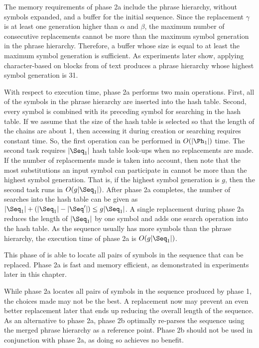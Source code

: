 The memory requirements of phase 2a include the phrase hierarchy,
without symbols expanded, and a buffer for the initial sequence.  
Since the replacement $\gamma$ is at least one generation
higher than $\alpha$ and $\beta$, the maximum number of consecutive
replacements cannot be more than the maximum symbol generation in the
phrase hierarchy.  Therefore, a buffer whose size is
equal to at least the maximum symbol generation is sufficient.
As experiments later show, applying character-based \repair
on blocks from  of text 
produces a phrase hierarchy whose highest
symbol generation is 31.

With respect to execution time, phase 2a performs two main operations.
First, all of the symbols in the phrase hierarchy are inserted into
the hash table.  Second, every symbol is combined with its preceding
symbol for searching in the hash table.  If we assume that
the size of the hash table is selected so that the length of
the chains are about 1, then
accessing it during creation or searching
requires constant time.  So, the first operation can be
performed in $O(|\Ph_1|)$ time.  The second task requires 
$|\Seq_1|$ hash table look-ups when no replacements are
made.  If the number of replacements made is taken into account, 
then note that the most substitutions an input symbol
can participate in cannot be more than the highest symbol 
generation.  That is, if the highest symbol generation is $g$,
then the second task runs in $O(g|\Seq_1|)$.  After phase 2a
completes, the number of searches into the hash table can be given
as $|\Seq_1| + (|\Seq_1| - |\Seq'|) \leq g|\Seq_1|$.
A single replacement during phase 2a reduces 
the length of $|\Seq_1|$ by one symbol and adds one search 
operation into the hash table.  
As the sequence usually has more symbols than the phrase
hierarchy, the execution time of phase 2a is $O(g|\Seq_1|)$.

This phase of \remerge is able to locate all pairs of symbols in
the sequence that can be replaced.  Phase 2a is fast and
memory efficient, as demonstrated in experiments later in this chapter.


While phase 2a locates all pairs of symbols in the sequence
produced by phase 1, the choices made may not be the best.
A replacement now may prevent an even better replacement later
that ends up reducing the overall length of the sequence.
As an alternative to phase 2a, phase 2b
optimally re-parses the sequence using the merged 
phrase hierarchy as a reference point.  Phase 2b should not
be used in conjunction with phase 2a, as doing so 
achieves no benefit.

